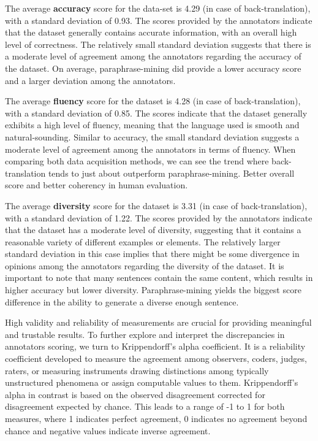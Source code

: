 \documentclass[fleqn,moreauthors,10pt]{ds_report}
\begin{document}
The average \textbf{accuracy} score for the data-set is 4.29 (in case of back-translation), with a standard deviation of 0.93. The scores provided by the annotators indicate that the dataset generally contains accurate information, with an overall high level of correctness. The relatively small standard deviation suggests that there is a moderate level of agreement among the annotators regarding the accuracy of the dataset. On average, paraphrase-mining did provide a lower accuracy score and a larger deviation among the annotators.

The average \textbf{fluency} score for the dataset is 4.28 (in case of back-translation), with a standard deviation of 0.85. The scores indicate that the dataset generally exhibits a high level of fluency, meaning that the language used is smooth and natural-sounding. Similar to accuracy, the small standard deviation suggests a moderate level of agreement among the annotators in terms of fluency. When comparing both data acquisition methods, we can see the trend where back-translation tends to just about outperform paraphrase-mining. Better overall score and better coherency in human evaluation.

The average \textbf{diversity} score for the dataset is 3.31 (in case of back-translation), with a standard deviation of 1.22. The scores provided by the annotators indicate that the dataset has a moderate level of diversity, suggesting that it contains a reasonable variety of different examples or elements. The relatively larger standard deviation in this case implies that there might be some divergence in opinions among the annotators regarding the diversity of the dataset. It is important to note that many sentences contain the same content, which results in higher accuracy but lower diversity. Paraphrase-mining yields the biggest score difference in the ability to generate a diverse enough sentence.

High validity and reliability of measurements are crucial for providing meaningful and trustable results. To further explore and interpret the discrepancies in annotators scoring, we turn to Krippendorff's alpha coefficient. It is a reliability coefficient developed to measure the agreement among observers, coders, judges, raters, or measuring instruments drawing distinctions among typically unstructured phenomena or assign computable values to them. Krippendorff's alpha in contrast is based on the observed disagreement corrected for disagreement expected by chance. This leads to a range of -1 to 1 for both measures, where 1 indicates perfect agreement, 0 indicates no agreement beyond chance and negative values indicate inverse agreement.
\end{document}
